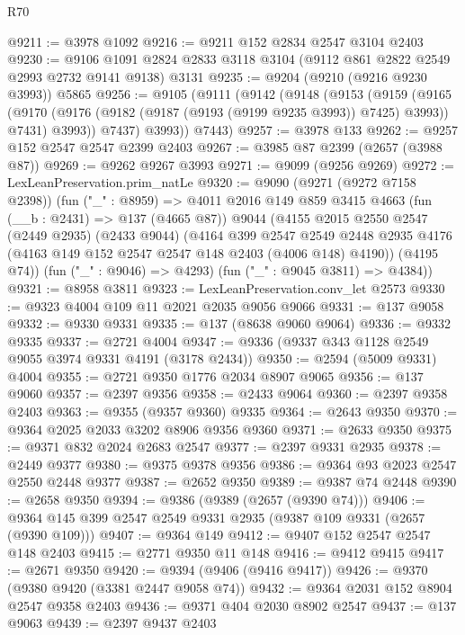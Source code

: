 \begin{lexlean}{R70}
\begin{coremodule}
@9211 := @3978 @1092
@9216 := @9211 @152 @2834 @2547 @3104 @2403
@9230 := @9106 @1091 @2824 @2833 @3118 @3104 (@9112 @861 @2822 @2549 @2993 @2732 @9141 @9138) @3131
@9235 := @9204 (@9210 (@9216 @9230 @3993)) @5865
@9256 := @9105
    (@9111
      (@9142
        (@9148
          (@9153
            (@9159
              (@9165
                (@9170 (@9176 (@9182 (@9187 (@9193 (@9199 @9235 @3993)) @7425) @3993)) @7431)
                @3993))
            @7437)
          @3993))
      @7443)
@9257 := @3978 @133
@9262 := @9257 @152 @2547 @2547 @2399 @2403
@9267 := @3985 @87 @2399 (@2657 (@3988 @87))
@9269 := @9262 @9267 @3993
@9271 := @9099 (@9256 @9269)
@9272 := LexLeanPreservation.prim_natLe
@9320 := @9090
    (@9271 (@9272 @7158 @2398))
    (fun ("_" : @8959) =>
    @4011
      @2016
      @149
      @859
      @3415
      @4663
      (fun (__b : @2431) => @137 (@4665 @87))
      @9044
      (@4155
        @2015
        @2550
        @2547
        (@2449 @2935)
        (@2433 @9044)
        (@4164
          @399
          @2547
          @2549
          @2448
          @2935
          @4176
          (@4163 @149 @152 @2547 @2547 @148 @2403 (@4006 @148) @4190))
        (@4195 @74))
      (fun ("_" : @9046) => @4293)
      (fun ("_" : @9045 @3811) => @4384))
@9321 := @8958 @3811
@9323 := LexLeanPreservation.conv_let @2573
@9330 := @9323 @4004 @109 @11 @2021 @2035 @9056 @9066
@9331 := @137 @9058
@9332 := @9330 @9331
@9335 := @137 (@8638 @9060 @9064)
@9336 := @9332 @9335
@9337 := @2721 @4004
@9347 := @9336 (@9337 @343 @1128 @2549 @9055 @3974 @9331 @4191 (@3178 @2434))
@9350 := @2594 (@5009 @9331) @4004
@9355 := @2721 @9350 @1776 @2034 @8907 @9065
@9356 := @137 @9060
@9357 := @2397 @9356
@9358 := @2433 @9064
@9360 := @2397 @9358 @2403
@9363 := @9355 (@9357 @9360) @9335
@9364 := @2643 @9350
@9370 := @9364 @2025 @2033 @3202 @8906 @9356 @9360
@9371 := @2633 @9350
@9375 := @9371 @832 @2024 @2683 @2547
@9377 := @2397 @9331 @2935
@9378 := @2449 @9377
@9380 := @9375 @9378 @9356
@9386 := @9364 @93 @2023 @2547 @2550 @2448 @9377
@9387 := @2652 @9350
@9389 := @9387 @74 @2448
@9390 := @2658 @9350
@9394 := @9386 (@9389 (@2657 (@9390 @74)))
@9406 := @9364 @145 @399 @2547 @2549 @9331 @2935 (@9387 @109 @9331 (@2657 (@9390 @109)))
@9407 := @9364 @149
@9412 := @9407 @152 @2547 @2547 @148 @2403
@9415 := @2771 @9350 @11 @148
@9416 := @9412 @9415
@9417 := @2671 @9350
@9420 := @9394 (@9406 (@9416 @9417))
@9426 := @9370 (@9380 @9420 (@3381 @2447 @9058 @74))
@9432 := @9364 @2031 @152 @8904 @2547 @9358 @2403
@9436 := @9371 @404 @2030 @8902 @2547
@9437 := @137 @9063
@9439 := @2397 @9437 @2403

\end{coremodule}
\end{lexlean}
